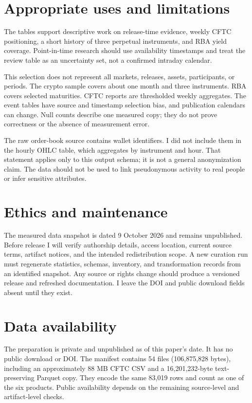 \documentclass[10pt]{article}
\begin{document}
\section{Appropriate uses and limitations}
The tables support descriptive work on release-time evidence, weekly CFTC positioning, a short history of three perpetual instruments, and RBA yield coverage. Point-in-time research should use availability timestamps and treat the review table as an uncertainty set, not a confirmed intraday calendar.

This selection does not represent all markets, releases, assets, participants, or periods. The crypto sample covers about one month and three instruments. RBA covers selected maturities. CFTC reports are thresholded weekly aggregates. The event tables have source and timestamp selection bias, and publication calendars can change. Null counts describe one measured copy; they do not prove correctness or the absence of measurement error.

The raw order-book source contains wallet identifiers. I did not include them in the hourly OHLC table, which aggregates by instrument and hour. That statement applies only to this output schema; it is not a general anonymization claim. The data should not be used to link pseudonymous activity to real people or infer sensitive attributes.

\section{Ethics and maintenance}
The measured data snapshot is dated 9 October 2026 and remains unpublished. Before release I will verify authorship details, access location, current source terms, artifact notices, and the intended redistribution scope. A new curation run must regenerate statistics, schemas, inventory, and transformation records from an identified snapshot. Any source or rights change should produce a versioned release and refreshed documentation. I leave the DOI and public download fields absent until they exist.

\section*{Data availability}
The preparation is private and unpublished as of this paper's date. It has no public download or DOI. The manifest contains 54 files (106,875,828 bytes), including an approximately 88 MB CFTC CSV and a 16,201,232-byte text-preserving Parquet copy. They encode the same 83,019 rows and count as one of the six products. Public availability depends on the remaining source-level and artifact-level checks.
\end{document}
